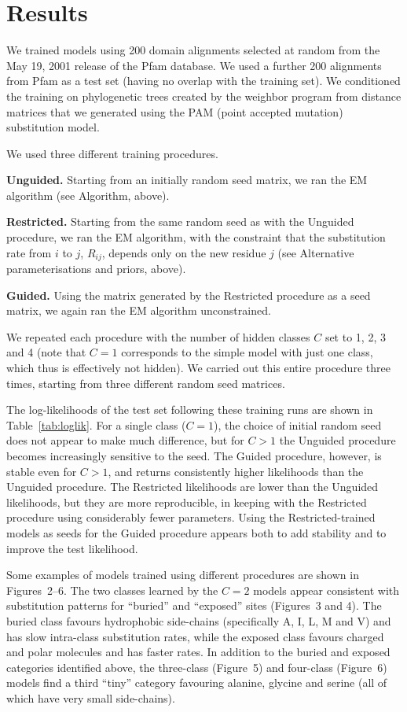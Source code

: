 \documentclass[12pt]{article}
\begin{document}
\section{Results}

We trained models using 200 domain alignments selected at random from the May 19, 2001 release of
the Pfam database.\cite{Bateman2000} We used a further 200 alignments from Pfam as a test set
(having no overlap with the training set). We conditioned the training on phylogenetic trees created
by the weighbor program from distance matrices that we generated using the PAM (point accepted
mutation) substitution model.\cite{Dayhoff1978}

We used three different training procedures.

\textbf{Unguided.} Starting from an initially random seed matrix, we ran the EM algorithm (see
Algorithm, above).

\textbf{Restricted.} Starting from the same random seed as with the Unguided procedure, we ran the
EM algorithm, with the constraint that the substitution rate from $i$ to $j$, $R_{ij}$, depends only
on the new residue $j$ (see Alternative parameterisations and priors, above).

\textbf{Guided.} Using the matrix generated by the Restricted procedure as a seed matrix, we again
ran the EM algorithm unconstrained.

We repeated each procedure with the number of hidden classes $C$ set to 1, 2, 3 and 4 (note that
$C = 1$ corresponds to the simple model with just one class, which thus is effectively not hidden).
We carried out this entire procedure three times, starting from three different random seed matrices.

The log-likelihoods of the test set following these training runs are shown in Table~\ref{tab:loglik}.
For a single class ($C = 1$), the choice of initial random seed does not appear to make much
difference, but for $C > 1$ the Unguided procedure becomes increasingly sensitive to the seed. The
Guided procedure, however, is stable even for $C > 1$, and returns consistently higher likelihoods
than the Unguided procedure. The Restricted likelihoods are lower than the Unguided likelihoods, but
they are more reproducible, in keeping with the Restricted procedure using considerably fewer
parameters. Using the Restricted-trained models as seeds for the Guided procedure appears both to add
stability and to improve the test likelihood.

Some examples of models trained using different procedures are shown in Figures~2--6. The two classes
learned by the $C = 2$ models appear consistent with substitution patterns for ``buried'' and
``exposed'' sites (Figures~3 and 4). The buried class favours hydrophobic side-chains (specifically
A, I, L, M and V) and has slow intra-class substitution rates, while the exposed class favours
charged and polar molecules and has faster rates. In addition to the buried and exposed categories
identified above, the three-class (Figure~5) and four-class (Figure~6) models find a third ``tiny''
category favouring alanine, glycine and serine (all of which have very small side-chains).
\end{document}
